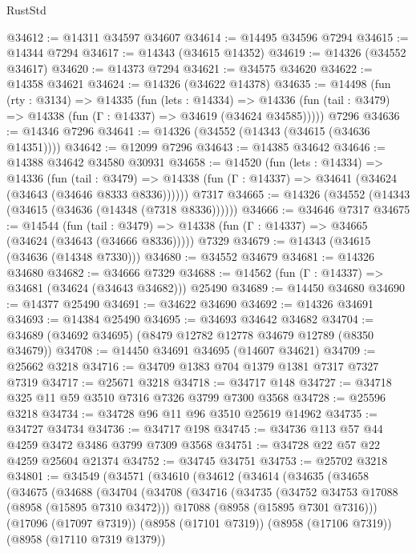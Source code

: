 \begin{lexlean}{RustStd}
\begin{coremodule}
@34612 := @14311 @34597 @34607
@34614 := @14495 @34596 @7294
@34615 := @14344 @7294
@34617 := @14343 (@34615 @14352)
@34619 := @14326 (@34552 @34617)
@34620 := @14373 @7294
@34621 := @34575 @34620
@34622 := @14358 @34621
@34624 := @14326 (@34622 @14378)
@34635 := @14498
    (fun (rty : @3134) =>
    @14335
      (fun (lets : @14334) =>
      @14336 (fun (tail : @3479) => @14338 (fun (Γ : @14337) => @34619 (@34624 @34585)))))
    @7296
@34636 := @14346 @7296
@34641 := @14326 (@34552 (@14343 (@34615 (@34636 @14351))))
@34642 := @12099 @7296
@34643 := @14385 @34642
@34646 := @14388 @34642 @34580 @30931
@34658 := @14520
    (fun (lets : @14334) =>
    @14336
      (fun (tail : @3479) =>
      @14338 (fun (Γ : @14337) => @34641 (@34624 (@34643 (@34646 @8333 @8336))))))
    @7317
@34665 := @14326 (@34552 (@14343 (@34615 (@34636 (@14348 (@7318 @8336))))))
@34666 := @34646 @7317
@34675 := @14544
    (fun (tail : @3479) => @14338 (fun (Γ : @14337) => @34665 (@34624 (@34643 (@34666 @8336)))))
    @7329
@34679 := @14343 (@34615 (@34636 (@14348 @7330)))
@34680 := @34552 @34679
@34681 := @14326 @34680
@34682 := @34666 @7329
@34688 := @14562 (fun (Γ : @14337) => @34681 (@34624 (@34643 @34682))) @25490
@34689 := @14450 @34680
@34690 := @14377 @25490
@34691 := @34622 @34690
@34692 := @14326 @34691
@34693 := @14384 @25490
@34695 := @34693 @34642 @34682
@34704 := @34689 (@34692 @34695) (@8479 @12782 @12778 @34679 @12789 (@8350 @34679))
@34708 := @14450 @34691 @34695 (@14607 @34621)
@34709 := @25662 @3218
@34716 := @34709 @1383 @704 @1379 @1381 @7317 @7327 @7319
@34717 := @25671 @3218
@34718 := @34717 @148
@34727 := @34718 @325 @11 @59 @3510 @7316 @7326 @3799 @7300 @3568
@34728 := @25596 @3218
@34734 := @34728 @96 @11 @96 @3510 @25619 @14962
@34735 := @34727 @34734
@34736 := @34717 @198
@34745 := @34736 @113 @57 @44 @4259 @3472 @3486 @3799 @7309 @3568
@34751 := @34728 @22 @57 @22 @4259 @25604 @21374
@34752 := @34745 @34751
@34753 := @25702 @3218
@34801 := @34549
    (@34571
      (@34610
        (@34612
          (@34614
            (@34635
              (@34658
                (@34675
                  (@34688
                    (@34704
                      (@34708
                        (@34716
                          (@34735
                            (@34752 @34753 @17088 (@8958 (@15895 @7310 @3472)))
                            @17088
                            (@8958 (@15895 @7301 @7316)))
                          (@17096 (@17097 @7319))
                          (@8958 (@17101 @7319))
                          (@8958 (@17106 @7319))
                          (@8958 (@17110 @7319 @1379))

\end{coremodule}
\end{lexlean}
